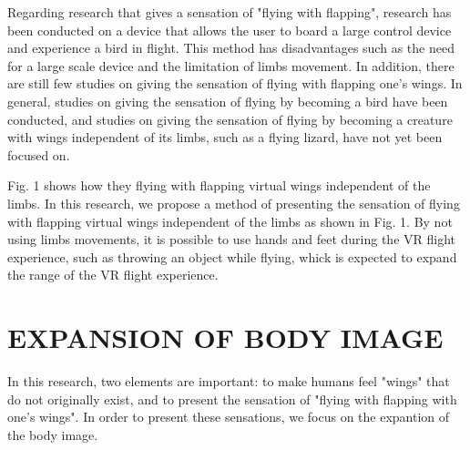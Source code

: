 \documentclass[letterpaper, 10 pt, conference]{ieeeconf}  %
\begin{document}
        Regarding research that gives a sensation of "flying with flapping", research has been conducted on a device that allows the user to board a large control device and experience a bird in flight\cite{rheiner2014birdly}.
        This method has disadvantages such as the need for a large scale device and the limitation of limbs movement.  
        In addition, there are still few studies on giving the sensation of flying with flapping one's wings.  
        In general, studies on giving the sensation of flying by becoming a bird have been conducted, and studies on giving the sensation of flying by becoming a creature with wings independent of its limbs, such as a flying lizard, have not yet been focused on.


        Fig. 1 shows how they flying  with flapping virtual wings independent of the limbs.  
        In this research, we propose a method of presenting the sensation of flying with flapping virtual wings independent of the limbs 
        as shown in Fig. 1.
        By not using limbs movements, it is possible to use hands and feet during the VR flight experience, such as throwing an object while flying, whick is expected to expand the range of the VR flight experience.


\section{EXPANSION OF BODY IMAGE}
        
        In this research, two elements are important: to make humans feel "wings" that do not originally exist, and to present the sensation of "flying with flapping with one's wings".  
        In order to present these sensations, we focus on the expantion of the body image.  
\end{document}
